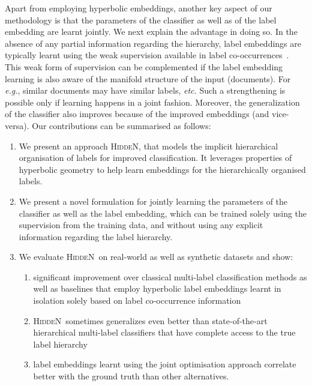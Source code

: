 \documentclass[11pt,a4paper]{article}
\newcommand{\model}{\mbox{\textsc{HiddeN}}}
\begin{document}
Apart from employing hyperbolic embeddings, another key aspect of our methodology is that the parameters of the classifier as well as of the label embedding are learnt jointly. We next explain the advantage in doing so. In the absence of any partial information regarding the hierarchy, label embeddings are typically learnt using the weak supervision available in label co-occurrences~\cite{poincare,lorentz}. This weak form of supervision can be complemented if the label embedding learning is also aware of the manifold structure of the input (documents). For {\em e.g.},  similar documents may have similar labels, {\em etc.} Such a strengthening is possible only if learning happens in a joint fashion. Moreover, the generalization of the classifier also improves because of the improved embeddings (and vice-versa).
Our contributions can be summarised as follows:
\begin{enumerate}[topsep=0pt,itemsep=-1ex,partopsep=1ex,parsep=1ex,leftmargin=*]
    \item We present an approach \model, that models the implicit hierarchical organisation of labels for improved classification. It leverages properties of hyperbolic geometry to help learn embeddings for the  hierarchically organised labels.
    \item We present a novel formulation for jointly learning the parameters of the classifier as well as the label embedding, which can be trained solely using the supervision from the training data, and without using any explicit information regarding the label hierarchy. 
    \item We evaluate \model\ on real-world  as well as synthetic datasets and show:
    \begin{enumerate}[topsep=-1ex,itemsep=-1ex,partopsep=1ex,parsep=1ex,leftmargin=1.5em]
        \item significant improvement over classical multi-label classification methods as well as baselines that employ hyperbolic label embeddings learnt in isolation solely based on label co-occurrence information
        \item \model\ sometimes generalizes even better than state-of-the-art hierarchical multi-label classifiers that have complete access to the true label hierarchy
        \item label embeddings learnt using the joint optimisation approach correlate better with the ground truth than other alternatives.
    \end{enumerate}
\end{enumerate}
\end{document}
